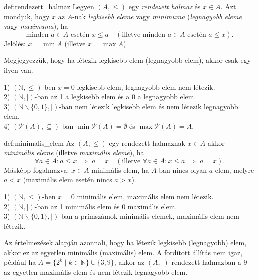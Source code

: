 \begin{definition}{def:rendezett_halmaz}
Legyen $(A,\leq)$ egy \emph{rendezett halmaz} és $x\in A$. Azt mondjuk,
hogy $x$ az $A$-nak \emph{legkisebb eleme} vagy \emph{minimuma}
(\emph{legnagyobb eleme} vagy \emph{maximuma}), ha 
\[
\text{minden }a\in A\text{ esetén }x\leq a\quad(\text{illetve minden }a\in A\text{ esetén }a\leq x).
\]
Jelölés: $x=\min A$ (illetve $x=\max A$). 
\end{definition}

\noindent Megjegyezzük, hogy ha létezik legkisebb elem (legnagyobb
elem), akkor csak egy ilyen van.
\begin{example}
1) $(\mathbb{N},\leq)$-ben $x=0$ legkisebb elem, legnagyobb elem
nem létezik.\\
 2) $(\mathbb{N},\mid)$-ban az 1 a legkisebb elem és a 0 a legnagyobb
elem.\\
 3) $(\mathbb{N}\backslash\{0,1\},\mid)$-ban nem létezik legkisebb
elem és nem létezik legnagyobb elem.\\
 4) $(\mathcal{P}(A),\subseteq)$-ban $\min\mathcal{P}(A)=\emptyset$
és $\max\mathcal{P}(A)=A$. 
\end{example}

\begin{definition}{def:minimalis_elem}
Az $(A,\leq)$ egy rendezett halmaznak $x\in A$ akkor \emph{minimális
eleme} (illetve \emph{maximális eleme}), ha 
\[
\forall a\in A:a\leq x\;\Rightarrow\;a=x\quad(\text{illetve }\forall a\in A:x\leq a\;\Rightarrow\;a=x).
\]
Másképp fogalmazva: $x\in A$ minimális elem, ha $A$-ban nincs olyan
$a$ elem, melyre $a<x$ (maximális elem esetén nincs $a>x$). 
\end{definition}

\begin{example}
1) $(\mathbb{N},\leq)$-ben $x=0$ minimális elem, maximális elem
nem létezik.\\
 2) $(\mathbb{N},\mid)$-ban az 1 minimális elem és 0 maximális elem.\\
 3) $(\mathbb{N}\backslash\{0,1\},\mid)$-ban a prímszámok minimális
elemek, maximális elem nem létezik. 
\end{example}

\medskip{}

Az értelmezések alapján azonnali, hogy ha létezik legkisebb (legnagyobb)
elem, akkor ez az egyetlen minimális (maximális) elem. A fordított
állítás nem igaz, például ha $A=\{2^{k}\mid k\in\mathbb{N}\}\cup\{3,9\}$,
akkor az $(A,\mid)$ rendezett halmazban a 9 az egyetlen maximális
elem és nem létezik legnagyobb elem.


